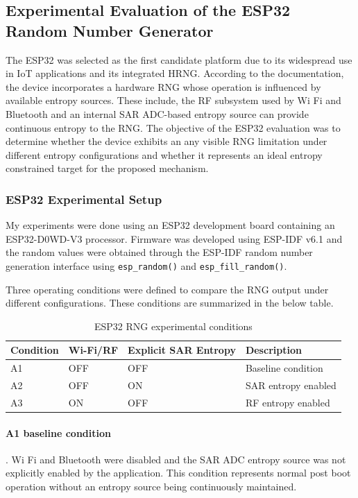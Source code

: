 \documentclass[a4paper, 12pt]{article}
\begin{document}
\subsection{Experimental Evaluation of the ESP32 Random Number Generator}
The ESP32 was selected as the first candidate platform due to its widespread
use in IoT applications and its integrated HRNG. According to the documentation, the
device incorporates a hardware RNG whose operation is influenced by available
entropy sources. These include, the RF subsystem used by Wi Fi and Bluetooth
and an internal SAR ADC-based entropy source can provide continuous entropy to
the RNG. The objective of the ESP32 evaluation was to determine whether the
device exhibits an any visible RNG limitation under different entropy configurations and whether it represents an ideal
entropy constrained target for the proposed mechanism.

\subsubsection{ESP32 Experimental Setup}

My experiments were done using an ESP32 development board containing an
ESP32-D0WD-V3 processor. Firmware was developed using ESP-IDF
v6.1 and the random values were obtained through the ESP-IDF random number generation
interface using \texttt{esp\_random()} and
\texttt{esp\_fill\_random()}.

Three operating conditions were defined to compare the  RNG
output under different configurations. These conditions are
summarized in the below table.

\begin{table}[htbp]
    \centering
    \caption{ESP32 RNG experimental conditions}
    \label{tab:esp32_conditions}
    \begin{tabular}{llll}
        \toprule
        \textbf{Condition} &
        \textbf{Wi-Fi/RF} &
        \textbf{Explicit SAR Entropy} &
        \textbf{Description} \\
        \midrule
        A1 & OFF & OFF & Baseline condition \\
        A2 & OFF & ON  & SAR entropy enabled \\
        A3 & ON  & OFF & RF entropy enabled \\
        \bottomrule
    \end{tabular}
\end{table}

\paragraph{A1 baseline condition}. Wi Fi and Bluetooth were disabled and
the SAR ADC entropy source was not explicitly enabled by the application. This
condition represents normal post boot operation without an entropy source
being continuously maintained.
\end{document}
